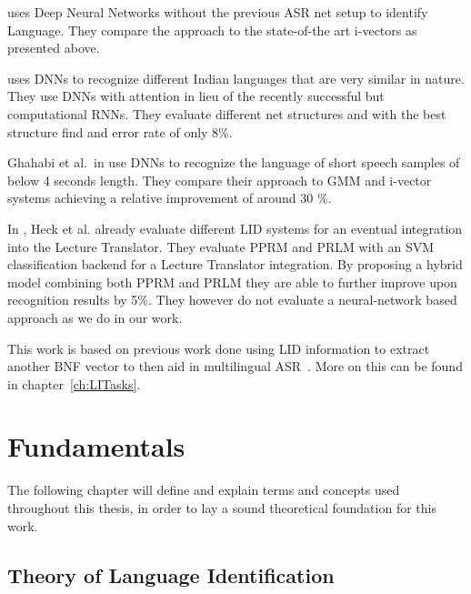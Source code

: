 \cite{6854622} uses Deep Neural Networks without the previous ASR net setup to identify Language. They compare the approach to the state-of-the art i-vectors as presented above.

\cite{K.V.+2016} uses DNNs to recognize different Indian languages that are very similar in nature. They use DNNs with attention in lieu of the recently successful but computational RNNs. They evaluate different net structures and with the best structure find and error rate of only 8\%.

Ghahabi et al.~in \cite{Ghahabi+2016} use DNNs to recognize the language of short speech samples of below 4 seconds length. They compare their approach to GMM and i-vector systems achieving a relative improvement of around 30 \%.

In \cite{6289007}, Heck et al. already evaluate different LID systems for an eventual integration into the Lecture Translator. They evaluate PPRM and PRLM with an SVM classification backend for a Lecture Translator integration. By proposing a hybrid model combining both PPRM and PRLM they are able to further improve upon recognition results by 5\%. They however do not evaluate a neural-network based approach as we do in our work.

This work is based on previous work done using LID information to extract another BNF vector to then aid in multilingual ASR~\cite{Mueller2016b}. More on this can be found in chapter~\ref{ch:LITasks}.

\chapter{Fundamentals}
\label{ch:fund}

The following chapter will define and explain terms and concepts used throughout this thesis, in order to lay a sound theoretical foundation for this work.

\section{Theory of Language Identification}


